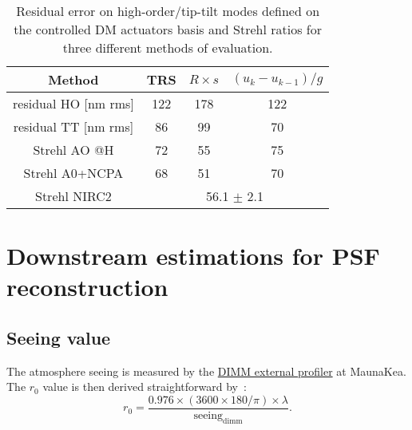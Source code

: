 \documentclass[12pt]{article}
\newcommand{\rz}{r_0}
\begin{document}
\begin{table}[h!] 
	\centering
	\begin{tabular}{|c|c|c|c|}
		\hline
		Method & TRS & $R \times s$& $(u_k - u_{k-1})/g$\\
		\hline
		residual HO [nm rms] & 122 & 178 & 122 \\						
		\hline
		residual TT [nm rms] & 86 & 99 & 70  \\
		\hline
		Strehl AO @H & 72& 55& 75\\
		\hline
		Strehl A0+NCPA & 68 &51 & 70 \\
		\hline
		Strehl NIRC2 & \multicolumn{3}{c|}{56.1 $\pm$ 2.1} \\
		\hline
	\end{tabular}
		\caption{Residual error on high-order/tip-tilt modes defined on the controlled DM actuators basis and Strehl ratios for three different methods of evaluation.}
		\label{T:rmsOPD}
\end{table}

\section{Downstream estimations for PSF reconstruction}
\subsection{Seeing value}
The atmosphere seeing is measured by the \href{http://mkwc.ifa.hawaii.edu/current/seeing/}{DIMM external profiler} at MaunaKea. The $\rz$ value is then derived straightforward by~:
\begin{equation}
	\rz = \dfrac{0.976\times(3600\times180/\pi)\times\lambda}{\text{seeing}_\text{dimm}}.
\end{equation}
\end{document}
